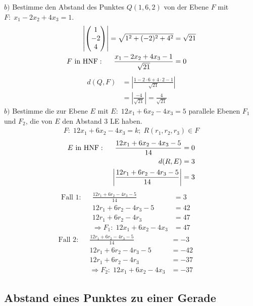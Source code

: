 \documentclass{article}
\begin{document}
\begin{boxx}[DarkBlue]{}
    $b)$\hspace{3mm} Bestimme den Abstand des Punktes $Q(1,6,2)$ von der Ebene $F$ mit $\displaystyle F:\;x_1 - 2x_2 + 4x_3 = 1$.
    \begin{align*}
        \left|\begin{pmatrix}1\\-2\\4\end{pmatrix}\right| = \sqrt{1^2 + (-2)^2 + 4^2} &= \sqrt{21} \\
        F \text{ in HNF}: \hspace*{5mm} \frac{x_1 - 2x_2 + 4x_3-1}{\sqrt{21}} &= 0
    \end{align*}
    \begin{align*}
        d(Q,F) &= \left|\frac{1- 2\cdot 6 + 4\cdot 2 - 1}{\sqrt{21}}\right|\\
        &=\left|\frac{-4}{\sqrt{21}}\right| = \frac{4}{\sqrt{21}}
    \end{align*}
    $b)$\hspace{3mm} Bestimme die zur Ebene $E$ mit $\displaystyle E:\; 12x_1 + 6x_2 - 4x_3 = 5$ parallele Ebenen $F_1$ und $F_2$, die von $E$ 
    \hspace*{6mm} den Abstand $3$ LE haben.
    \begin{align*}
        F:\; 12x_1 + 6x_2 - 4x_3 = k;\;R(r_1,r_2,r_3) \in F
    \end{align*}
    \begin{align*}
        E \text{ in HNF}: \hspace*{5mm} \frac{12x_1+6x_2-4x_3-5}{14} &= 0\\
        d(R,E) &= 3 \\
        \left|\frac{12r_1+6r_2-4r_3-5}{14}\right| &= 3 \\
    \end{align*}
    \begin{align*}
        \text{Fall 1}:&&\frac{12r_1+6r_2-4r_3-5}{14} &= 3&&\\
        &&12r_1+6r_2-4r_3-5 &= 42 \\
        &&12r_1+6r_2-4r_3 &= 47 \\
        &&\Rightarrow F_1:\; 12x_1+6x_2-4x_3 &= 47
    \end{align*}
    \begin{align*}
        \text{Fall 2}:&&\frac{12r_1+6r_2-4r_3-5}{14} &= -3 &&\\
        &&12r_1+6r_2-4r_3-5 &= -42 \\
        &&12r_1+6r_2-4r_3 &= -37 \\
        &&\Rightarrow F_2:\; 12x_1+6x_2-4x_3 &= -37
    \end{align*}
\end{boxx}
\subsection{Abstand eines Punktes zu einer Gerade}
\end{document}
